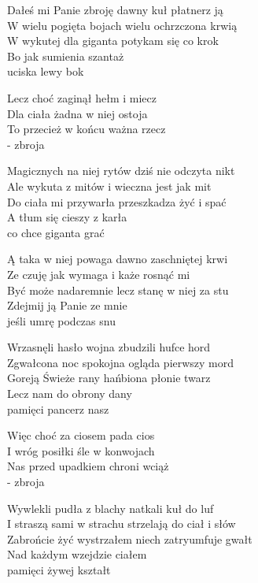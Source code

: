 \begin{text}
    Dałeś mi Panie zbroję dawny kuł płatnerz ją\\
    W wielu pogięta bojach wielu ochrzczona krwią\\
    W wykutej dla giganta potykam się co krok\\
    Bo jak sumienia szantaż\\
	uciska lewy bok

    \vin Lecz choć zaginął hełm i miecz\\
    \vin Dla ciała żadna w niej ostoja\\
    \vin To przecież w końcu ważna rzecz\\
    \vin - zbroja

    Magicznych na niej rytów dziś nie odczyta nikt\\
    Ale wykuta z mitów i wieczna jest jak mit\\
    Do ciała mi przywarła przeszkadza żyć i spać\\
    A tłum się cieszy z karła\\
	co chce giganta grać

    Ą taka w niej powaga dawno zaschniętej krwi\\
    Ze czuję jak wymaga i każe rosnąć mi\\
    Być może nadaremnie lecz stanę w niej za stu\\
    Zdejmij ją Panie ze mnie\\
	jeśli umrę podczas snu

    Wrzasnęli hasło wojna zbudzili hufce hord\\
    Zgwałcona noc spokojna ogląda pierwszy mord\\
    Goreją Świeże rany hańbiona płonie twarz\\
    Lecz nam do obrony dany\\
	pamięci pancerz nasz

    \vin Więc choć za ciosem pada cios\\
    \vin I wróg posiłki śle w konwojach\\
    \vin Nas przed upadkiem chroni wciąż\\
	\vin - zbroja

    Wywlekli pudła z blachy natkali kuł do luf\\
    I straszą sami w strachu strzelają do ciał i słów\\
    Zabrońcie żyć wystrzałem niech zatryumfuje gwałt\\
    Nad każdym wzejdzie ciałem\\
	pamięci żywej kształt


\end{text}
